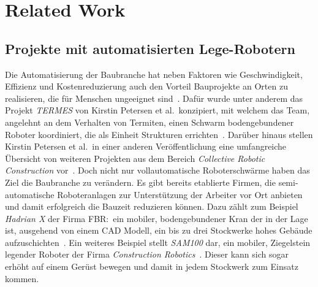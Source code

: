 \chapter{Related Work}\label{related}
\section{Projekte mit automatisierten Lege-Robotern}
Die Automatisierung der Baubranche hat neben Faktoren wie Geschwindigkeit, Effizienz und Kostenreduzierung auch den Vorteil Bauprojekte an Orten zu realisieren, die für Menschen ungeeignet sind~\cite{Petersen2012}.
Dafür wurde unter anderem das Projekt \textit{TERMES} von Kirstin Petersen et al.\ konzipiert, mit welchem das Team, angelehnt an dem Verhalten von Termiten, einen Schwarm bodengebundener Roboter koordiniert, die als Einheit Strukturen errichten~\cite{Petersen2012}.
Darüber hinaus stellen Kirstin Petersen et al.\ in einer anderen Veröffentlichung eine umfangreiche Übersicht von weiteren Projekten aus dem Bereich \textit{Collective Robotic Construction} vor~\cite{Petersen2019}.
Doch nicht nur vollautomatische Roboterschwärme haben das Ziel die Baubranche zu verändern.
Es gibt bereits etablierte Firmen, die semi-automatische Roboteranlagen zur Unterstützung der Arbeiter vor Ort anbieten und damit erfolgreich die Bauzeit reduzieren können.
Dazu zählt zum Beispiel \textit{Hadrian X} der Firma FBR:\ ein mobiler, bodengebundener Kran der in der Lage ist, ausgehend von einem CAD Modell, ein bis zu drei Stockwerke hohes Gebäude aufzuschichten~\cite{HadrianX}.
Ein weiteres Beispiel stellt \textit{SAM100} dar, ein mobiler, Ziegelstein legender Roboter der Firma \textit{Construction Robotics}~\cite{SAM}.
Dieser kann sich sogar erhöht auf einem Gerüst bewegen und damit in jedem Stockwerk zum Einsatz kommen.

